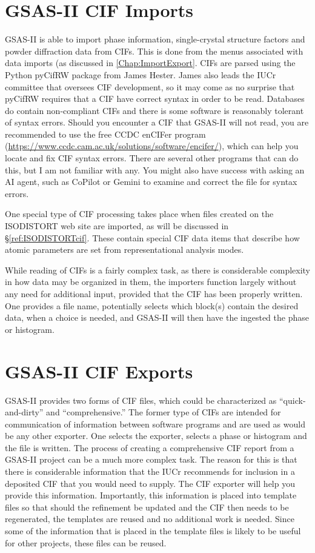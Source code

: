 \section{GSAS-II CIF Imports}
GSAS-II is able to import phase information, single-crystal structure factors and powder diffraction data from CIFs. This is done from the menus associated with data imports (as discussed in \ref{Chap:ImportExport}. CIFs are parsed using the Python pyCifRW package from James Hester. James also leads the IUCr committee that oversees CIF development, so it may come as no surprise that pyCifRW requires that a CIF have correct syntax in order to be read. Databases do contain non-compliant CIFs and there is some software is reasonably tolerant of syntax errors. Should you encounter a CIF that GSAS-II will not read, you are recommended to use the free CCDC enCIFer program (\url{https://www.ccdc.cam.ac.uk/solutions/software/encifer/}), which can help you locate and fix CIF syntax errors. There are several other programs that can do this, but I am not familiar with any. You might also have success with asking an AI agent, such as CoPilot or Gemini to examine and correct the file for syntax errors. 

One special type of CIF processing takes place when files created on the ISODISTORT web site are imported, as will be discussed in \S\ref{ref:ISODISTORTcif}. These contain special CIF data items that describe how atomic parameters are set from representational analysis modes. 

While reading of CIFs is a fairly complex task, as there is considerable complexity in how data may be organized in them, the importers function largely without any need for additional input, provided that the CIF has been properly written. One provides a file name, potentially selects which block(s) contain the desired data, when a choice is needed, and GSAS-II will then have the ingested the phase or histogram. 

\section{GSAS-II CIF Exports}

GSAS-II provides two forms of CIF files, which could be characterized as ``quick-and-dirty'' and ``comprehensive.'' The former type of CIFs are intended for communication of information between software programs and are used as would be any other exporter. One selects the exporter, selects a phase or histogram and the file is written. The process of creating a comprehensive CIF report from a GSAS-II project can be a much more complex task. The reason for this is that there is considerable information that the IUCr recommends for inclusion in a deposited CIF that you would need to supply. The CIF exporter will help you provide this information. Importantly, this information is placed into template files so that should the refinement be updated and the CIF then needs to be regenerated, the templates are reused and no additional work is needed. Since some of the information that is placed in the template files is likely to be useful for other projects, these files can be reused.

